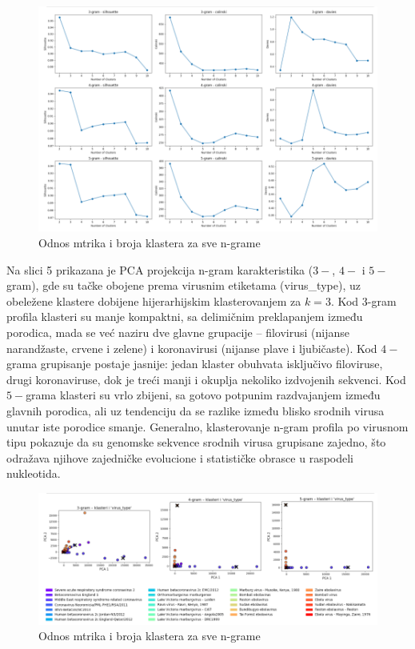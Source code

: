 \documentclass[a4paper,12pt]{article}
\begin{document}
\begin{figure}[h!]
    \centering
    \includegraphics[width=1\textwidth]{images/hcamino.png}
    \caption{Odnos mtrika i broja klastera za sve n-grame}
    \label{fig:hc_aa_metricks}
\end{figure}

\noindent
\begin{minipage}{\textwidth}
Na slici 5 prikazana je PCA projekcija n-gram karakteristika ($3-$, $4-$ i $5-$gram), gde su tačke obojene prema virusnim etiketama (virus\_type), uz obeležene klastere dobijene hijerarhijskim klasterovanjem za $k=3$. Kod 3-gram profila klasteri su manje kompaktni, sa delimičnim preklapanjem između porodica, mada se već naziru dve glavne grupacije – filovirusi (nijanse narandžaste, crvene i zelene) i koronavirusi (nijanse plave i ljubičaste). Kod $4-$grama grupisanje postaje jasnije: jedan klaster obuhvata isključivo filoviruse, drugi koronaviruse, dok je treći manji i okuplja nekoliko izdvojenih sekvenci. Kod $5-$grama klasteri su vrlo zbijeni, sa gotovo potpunim razdvajanjem između glavnih porodica, ali uz tendenciju da se razlike između blisko srodnih virusa unutar iste porodice smanje. Generalno, klasterovanje n-gram profila po virusnom tipu pokazuje da su genomske sekvence srodnih virusa grupisane zajedno, što odražava njihove zajedničke evolucione i statističke obrasce u raspodeli nukleotida.
\end{minipage}

\begin{figure}[h!]
    \centering
    \includegraphics[width=1.2\textwidth]{images/hcvirusaa.png}
    \caption{Odnos mtrika i broja klastera za sve n-grame}
    \label{fig:hc_virus}
\end{figure}
\end{document}
